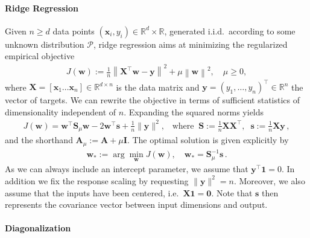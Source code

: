 \documentclass{article}
\newcommand{\w}{{\mathbf w}}
\newcommand{\y}{{\mathbf y}}
\newcommand{\I}{{\mathbf I}}
\newcommand{\mX}{{\mathbf X}}
\newcommand{\x}{{\mathbf x}}
\renewcommand{\Re}{{\mathbb R}}
\newcommand{\mS}{{\mathbf S}}
\newcommand{\s}{{\mathbf s}}
\begin{document}
\paragraph{Ridge Regression} 
Given $n \ge d$ data points $(\x_i,y_i) \in \Re^d \times \Re$, generated i.i.d.~according to some unknown distribution $\mathcal P$, ridge regression aims at minimizing the regularized empirical objective 
\begin{align}
J(\w) :=  \frac 1{n} \left\| \mX^\top \w - \y \right\|^2 + \mu \left\| \w \right\|^2,\quad \mu \ge 0,
\end{align}
where $\mX = [\x_1  \dots  \x_n ] \in \Re^{d \times n}$ is the data matrix and $\y = (y_1,\dots, y_n)^\top \in \Re^n$ the vector of targets. We can rewrite the objective in terms of sufficient statistics of dimensionality independent of $n$. Expanding the squared norms yields
\begin{align}
J(\w) =  \w^\top \mS_\mu \w  -  2 \w^\top \s + \tfrac 1{n} \|\y\|^2, \;\;\; \text{where} \;\; 
\mS := \tfrac1n \mX \mX^\top, \;\; \s := \tfrac 1n  \mX \y\,,
\end{align}
and the shorthand $\mathbf A_\mu := \mathbf A + \mu \I$. 
%
The optimal solution is given explicitly by 
\begin{align}
\w_* := \arg\min_\w J(\w), \quad \w_* = \mS_\mu^{-1} \s\,.
\end{align}
As we can always include an intercept parameter, we assume that $\y^\top {\bm 1}=0$. In addition we fix the response scaling by requesting $\| \y\|^2=n$. Moreover, we also assume that the inputs have been centered, i.e.~$\mX {\bm 1} = {\bm 0}$. Note that $\s$ then represents the covariance vector between input dimensions and output.

\paragraph{Diagonalization} 
\end{document}
